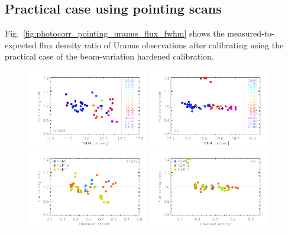 \subsection{Practical case using pointing scans}
\label{se:cal_pointings}


Fig.~\ref{fig:photocorr_pointing_uranus_flux_fwhm} shows the
measured-to-expected flux density ratio of Uranus observations after
calibrating using the practical case of the beam-variation
hardened calibration. 

\begin{figure}[ht!]
\begin{center}
\includegraphics[clip=true,width=0.47\textwidth]{Figures/Calibration/Photocorr/plot_flux_density_ratio_primaryphotocorr_pointing_1mm.pdf}
\includegraphics[clip=true,width=0.47\textwidth]{Figures/Calibration/Photocorr/plot_flux_density_ratio_primaryphotocorr_pointing_a2.pdf}
\includegraphics[clip=true,width=0.47\textwidth]{Figures/Calibration/Photocorr/plot_flux_density_ratio_obstau_primaryphotocorr_pointing_1mm.pdf}
\includegraphics[clip=true,width=0.47\textwidth]{Figures/Calibration/Photocorr/plot_flux_density_ratio_obstau_primaryphotocorr_pointing_a2.pdf}

\end{center}
\end{figure}
